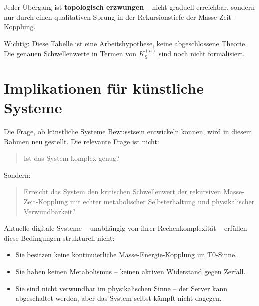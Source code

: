 	\begin{table}[h]
		\centering
		\caption{Hierarchie diskreter Komplexitätsschwellen}
	\end{table}
	
	Jeder Übergang ist \textbf{topologisch erzwungen} -- nicht graduell erreichbar, sondern nur durch einen qualitativen Sprung in der Rekursionstiefe der Masse-Zeit-Kopplung.
	
	Wichtig: Diese Tabelle ist eine Arbeitshypothese, keine abgeschlossene Theorie. Die genauen Schwellenwerte in Termen von $K_{\text{S}}^{(n)}$ sind noch nicht formalisiert.
	
	\section{Implikationen für künstliche Systeme}
	
	Die Frage, ob künstliche Systeme Bewusstsein entwickeln können, wird in diesem Rahmen neu gestellt. Die relevante Frage ist nicht:
	\begin{quote}
		Ist das System komplex genug?
	\end{quote}
	Sondern:
	\begin{quote}
		Erreicht das System den kritischen Schwellenwert der rekursiven Masse-Zeit-Kopplung mit echter metabolischer Selbsterhaltung und physikalischer Verwundbarkeit?
	\end{quote}
	
	Aktuelle digitale Systeme -- unabhängig von ihrer Rechenkomplexität -- erfüllen diese Bedingungen strukturell nicht:
	\begin{itemize}
		\item Sie besitzen keine kontinuierliche Masse-Energie-Kopplung im T0-Sinne.
		\item Sie haben keinen Metabolismus -- keinen aktiven Widerstand gegen Zerfall.
		\item Sie sind nicht verwundbar im physikalischen Sinne -- der Server kann abgeschaltet werden, aber das System selbst kämpft nicht dagegen.
	\end{itemize}
	
